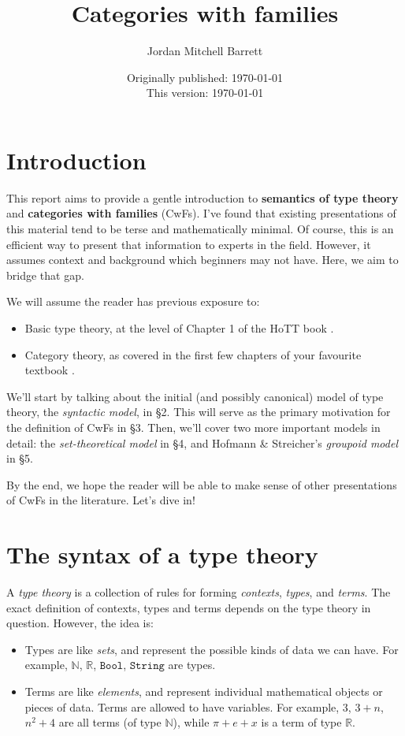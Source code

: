 \documentclass{article}
\title{Categories with families}
\author{Jordan Mitchell Barrett}
\date{Originally published: {\color{red} \today} \\[2mm] This version: \today}
\theoremstyle{definition}
\newcommand{\Bool}{\mathtt{Bool}}
\newcommand{\String}{\mathtt{String}}
\newcommand{\N}{\mathbb{N}}		        	    %
\newcommand{\R}{\mathbb{R}}		        	    %
\begin{document}
\maketitle
\tableofcontents

\section{Introduction}

This report aims to provide a gentle introduction to \textbf{semantics of type theory} and \textbf{categories with families} (CwFs). I've found that existing presentations of this material tend to be terse and mathematically minimal. Of course, this is an efficient way to present that information to experts in the field. However, it assumes context and background which beginners may not have. Here, we aim to bridge that gap.

We will assume the reader has previous exposure to:
\begin{itemize}
    \item Basic type theory, at the level of Chapter 1 of the HoTT book \cite{hottbook}.
    
    \item Category theory, as covered in the first few chapters of your favourite textbook \cite{leinster, maclane}.
\end{itemize}

We'll start by talking about the initial (and possibly canonical) model of type theory, the \textit{syntactic model}, in \S2. This will serve as the primary motivation for the definition of CwFs in \S3. Then, we'll cover two more important models in detail: the \textit{set-theoretical model} in \S4, and Hofmann \& Streicher's \textit{groupoid model} \cite{gpoid} in \S5.

By the end, we hope the reader will be able to make sense of other presentations of CwFs in the literature. Let's dive in!


\section{The syntax of a type theory}
\label{sec:syntax}

A \textit{type theory} is a collection of rules for forming \textit{contexts}, \textit{types}, and \textit{terms}. The exact definition of contexts, types and terms depends on the type theory in question. However, the idea is:
\begin{itemize}
    \item Types are like \textit{sets}, and represent the possible kinds of data we can have. For example, $\N$, $\R$, $\Bool$, $\String$ are types.
    
    \item Terms are like \textit{elements}, and represent individual mathematical objects or pieces of data. Terms are allowed to have variables. For example, $3$, $3 + n$, $n^2 + 4$ are all terms (of type $\N$), while $\pi + e + x$ is a term of type $\R$.
\end{itemize}
\end{document}
